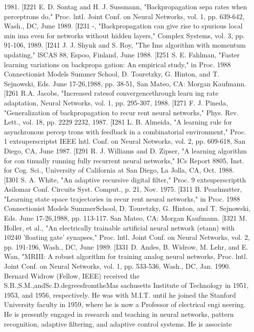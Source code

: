 \documentclass[11pt,a4paper,twocolumn]{article}
\begin{document}
{{1981. 
[I221 E. D. Sontag and H. J. Sussmann, "Backpropagation sepa
rates when perceptrons do," Proc. lntl. Joint Conf. on Neural 
Networks, vol. 1, pp. 639-642, Wash., DC, June 1989. 
[I231 -, 
"Backpropagation can give rise to spurious local min
ima even for networks without hidden layers," Complex 
Systems, vol. 3, pp. 91-106, 1989. 
[I241 J. J. Shynk and S. Roy, "The Ims algorithm with momentum 
updating," lSCAS 88, Espoo, Finland, June 1988. 
[I251 S. E. Fahlman, "Faster learning variations on backpropa
gation: An empirical study," in Proc. 1988 Connectionist 
Models Summer School, D. Touretzky, G. Hinton, and T. 
Sejnowski, Eds. June 17-26,1988, pp. 38-51, San Mateo, CA: 
Morgan Kaufmann. 
[I261 R.A. Jacobs, "Increased ratesof convergencethrough learn
ing rate adaptation, Neural Networks, vol. 1, pp. 295-307, 
1988. 
[I271 F. J. Pineda, "Generalization of backpropagation to recur
rent neural networks," Phys. Rev. Lett., vol. 18, pp. 2229
2232, 1987. 
[I281 L. B. Almeida, "A learning rule for asynchronous percep
trons with feedback in a combinatorial environment," Proc. 
1	extsuperscript{st} IEEE lntl. Conf. on Neural Networks, vol. 2, pp. 609-618, 
San Diego, CA, June 1987. 
[I291 R. J. Williams and D. Zipser, "A learning algorithm for con
tinually running fully recurrent neural networks," ICs 
Report 8805, Inst. for Cog. Sci., University of California at 
San Diego, La Jolla, CA, Oct. 1988. 
[I301 S. A. White, "An adaptive recursive digital filter," Proc. 9	extsuperscript{th} 
Asilomar Conf. Circuits Syst. Comput., p. 21, Nov. 1975. 
[I311 B. Pearlmutter, "Learning state space trajectories in recur
rent neural networks," in Proc. 1988 Connectionist Models 
SummerSchool, D. Touretzky, G. Hinton, and T. Sejnowski, 
Eds. June 17-26,1988, pp. 113-117. San Mateo, CA: Morgan 
Kaufmann. 
[I321 M. Holler, et al., "An electrically trainable artificial neural 
network (etann) with 10240 'floating gate' synapses," Proc. 
lntl. Joint Conf. on Neural Networks, vol. 2, pp. 191-196, 
Wash., DC, June 1989. 
[I331 D. Andes, B. Widrow, M. Lehr, and E. Wan, "MRIII: A robust 
algorithm for training analog neural networks, Proc. lntl. 
Joint Conf. on Neural Networks, vol. 1, pp. 533-536, Wash., 
DC, Jan. 1990. 
Bernard Widrow (Fellow, IEEE) received the 
S.B.,S.M.,andSc.D.degreesfromtheMas
sachusetts Institute of Technology in 1951, 
1953, and 1956, respectively. 
He was with M.I.T. until he joined the 
Stanford University faculty in 1959, where 
he is now a Professor of electrical engi
neering. He is presently engaged in 
research and teaching in neural networks, 
pattern recognition, adaptive filtering, and 
adaptive control systems. He is associate 






}}
\end{document}
